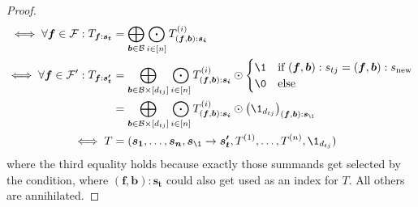 \begin{proof}
\begin{align*}
        \iff \forall \bm{f} \in \mathcal{F}: T_{\bm{f}:\bm{s_t}}   & = \bigoplus\limits_{\bm{b} \in \mathcal{B}} \bigodot\limits_{i \in [n]} T^{(i)}_{(\bm{f}, \bm{b}):\bm{s_i}}                                                                             \\
        \iff \forall \bm{f} \in \mathcal{F}': T_{\bm{f}:\bm{s'_t}} & = \bigoplus\limits_{\bm{b} \in \mathcal{B} \times [d_{tj}]} \bigodot\limits_{i \in [n]} T^{(i)}_{(\bm{f}, \bm{b}):\bm{s_i}} \odot \begin{cases}
            \1 & \text{if $(\bm{f}, \bm{b}): s_{tj} = (\bm{f}, \bm{b}): s_{\text{new}}$} \\
            \0 & \text{else}
        \end{cases}                             \\
                                                                   & = \bigoplus\limits_{\bm{b} \in \mathcal{B} \times [d_{tj}]} \bigodot\limits_{i \in [n]} T^{(i)}_{(\bm{f}, \bm{b}):\bm{s_i}} \odot \left(\1_{d_{tj}}\right)_{(\bm{f}, \bm{b}):\bm{s_\1}} \\
        \iff T                                                     & = (\bm{s_1}, \dots, \bm{s_n}, \bm{s_\1} \rightarrow \bm{s'_t}, T^{(1)}, \dots, T^{(n)}, \1_{d_{tj}})
    \end{align*}
    where the third equality holds because exactly those summands get selected by the condition, where $(\bm{f}, \bm{b}):\bm{s_t}$ could also get used as an index for $T$.
    All others are annihilated.
\end{proof}
\bigskip